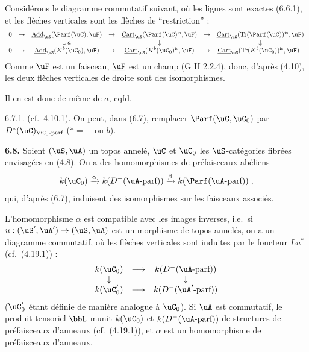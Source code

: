 Consid\'{e}rons le diagramme commutatif suivant, o\`{u} les lignes sont exactes (6.6.1), et les fl\`{e}ches verticales sont les fl\`{e}ches de ``restriction'' :
\[
\begin{array}{ccccccccc}
0 & \rightarrow & \underline{\operatorname{Add}}_{\uS}(\Parf(\uC),\uF) & \rightarrow & \underline{\operatorname{Cart}}_{\uS}(\Parf(\uC)^{\mathrm{is}},\uF) & \rightarrow & \underline{\operatorname{Cart}}_{\uS}(\operatorname{Tr}(\Parf(\uC))^{\mathrm{is}},\uF) \\
  &             & \downarrow a                &             & \downarrow                        &             & \downarrow                        \\
0 & \rightarrow & \underline{\operatorname{Add}}_{\uS}(K^b(\uC_0),\uF) & \rightarrow & \underline{\operatorname{Cart}}_{\uS}(K^b(\uC_0)^{\mathrm{is}},\uF) & \rightarrow & \underline{\operatorname{Cart}}_{\uS}(\operatorname{Tr}(K^b(\uC_0))^{\mathrm{is}},\uF) \; .
\end{array}
\]
Comme $\uF$ est un faisceau, $\underline{\uF}$ est un champ (G II 2.2.4), donc, d'apr\`{e}s (4.10), les deux fl\`{e}ches verticales de droite sont des isomorphismes.

Il en est donc de m\^{e}me de $a$, cqfd.

\begin{remarque} 6.7.1. (cf.~4.10.1).
On peut, dans (6.7), remplacer $\Parf(\uC,\uC_0)$ par $D^*(\uC)_{\uC_0\text{-parf}}$ ($* = -$ ou $b$).
\end{remarque}

\bigskip
\noindent\textbf{6.8.} Soient $(\uS,\uA)$ un topos annel\'{e}, $\uC$ et $\uC_0$ les $\uS$-cat\'{e}gories fibr\'{e}es envisag\'{e}es en (4.8). On a des homomorphismes de pr\'{e}faisceaux ab\'{e}liens
\[
k(\uC_0) \xrightarrow{\alpha} k(D^-(\uA\text{-parf})) \xrightarrow{\beta} k(\Parf(\uA\text{-parf})) \; ,
\]
qui, d'apr\`{e}s (6.7), induisent des isomorphismes sur les faisceaux associ\'{e}s.

L'homomorphisme $\alpha$ est compatible avec les images inverses, i.e.~si $u : (\uS',\uA') \rightarrow (\uS,\uA)$ est un morphisme de topos annel\'{e}s, on a un diagramme commutatif, o\`{u} les fl\`{e}ches verticales sont induites par le foncteur $Lu^*$ (cf.~(4.19.1)) :
\[
\begin{array}{ccc}
k(\uC_0) & \longrightarrow & k(D^-(\uA\text{-parf})) \\
\downarrow & & \downarrow \\
k(\uC'_0) & \longrightarrow & k(D^-(\uA'\text{-parf}))
\end{array}
\]
($\uC'_0$ \'{e}tant d\'{e}finie de mani\`{e}re analogue \`{a} $\uC_0$). Si $\uA$ est commutatif, le produit tensoriel $\bbL$ munit $k(\uC_0)$ et $k(D^-(\uA\text{-parf}))$ de structures de pr\'{e}faisceaux d'anneaux (cf.~(4.19.1)), et $\alpha$ est un homomorphisme de pr\'{e}faisceaux d'anneaux.

